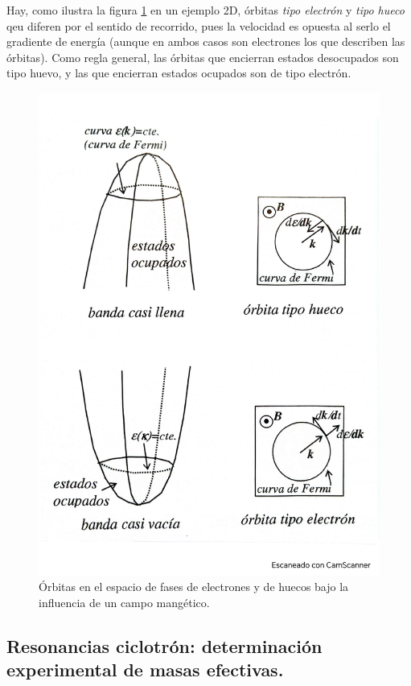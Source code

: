 Hay, como ilustra la figura \ref{Fig:08-04} en un ejemplo 2D, órbitas \textit{tipo electrón} y \textit{tipo hueco} qeu diferen por el sentido de recorrido, pues la velocidad es opuesta al serlo el gradiente de energía (aunque en ambos casos son electrones los que describen las órbitas). Como regla general, las órbitas que encierran estados desocupados son tipo huevo, y las que encierran estados ocupados son de tipo electrón.

\begin{figure}[h!] \centering
	\includegraphics[scale=0.5]{Cuerpo/Ch_08/Fotos libro 4.pdf}
	\caption{Órbitas en el espacio de fases de electrones y de huecos bajo la influencia de un campo mangético.}
	\label{Fig:08-04}
\end{figure}

\subsection{Resonancias ciclotrón: determinación experimental de masas efectivas.}

